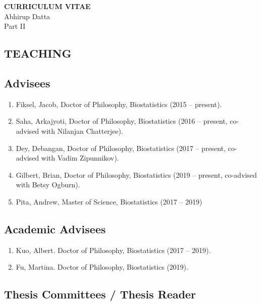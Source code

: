 \documentclass[10pt]{article}
\newcommand{\myben}[1]{\smallskip\begin{enumerate}[start=1,label={\scriptsize \arabic*$\ $},leftmargin=\parindent]\setlength{\itemsep}{#1}\vspace*{-0.7em}}
\newcommand{\ee}{\end{enumerate}}
\newcommand{\mylift}[1]{\vspace*{#1}}
\begin{document}
\newpage

\begin{center}
{\bf CURRICULUM VITAE}\\
Abhirup Datta\\[3mm]
Part II
\end{center}

\vspace*{0em}

\subsection*{TEACHING}

\smallskip

\subsection*{Advisees}

\myben{-0.1em}
\item Fiksel, Jacob, Doctor of Philosophy, Biostatistics (2015 -- present).
\item Saha, Arkajyoti, Doctor of Philosophy, Biostatistics (2016 -- present, co-advised with Nilanjan Chatterjee).
\item Dey, Debangan, Doctor of Philosophy, Biostatistics (2017 -- present, co-advised with Vadim Zipunnikov).
\item Gilbert, Brian, Doctor of Philosophy, Biostatistics (2019 -- present, co-advised with Betsy Ogburn).
\item Pita, Andrew, Master of Science, Biostatistics (2017 -- 2019)

\ee

\mylift{-1.5em}

\subsection*{Academic Advisees}

\myben{-0.1em}

\item Kuo, Albert. Doctor of Philosophy, Biostatistics (2017 -- 2019).
\item Fu, Martina. Doctor of Philosophy, Biostatistics (2019).

\ee

\mylift{-1.5em}

\subsection*{Thesis Committees / Thesis Reader}
\end{document}
